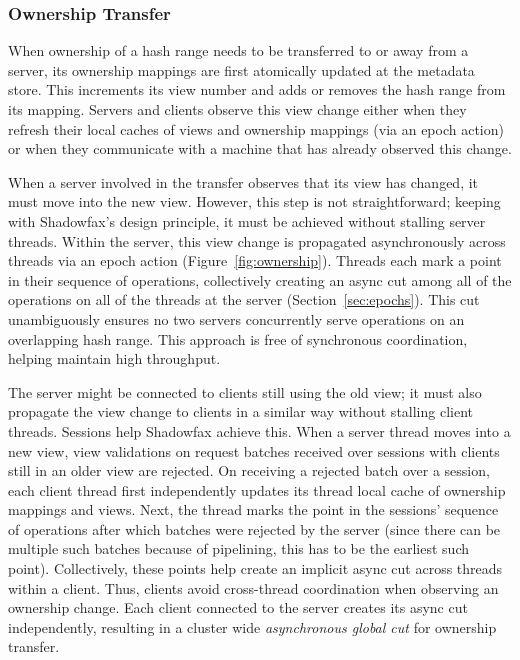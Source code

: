\subsubsection{Ownership Transfer}
\label{design:ownership-tx}

When ownership of a hash range needs to be transferred to or away from a
server, its ownership mappings are first atomically updated at the
metadata store.
%
This increments its view number and adds or removes the hash range from
its mapping.
%
Servers and clients observe this view change either when they refresh
their local caches of views and ownership mappings (via an epoch action) or
when they communicate with a machine that has already observed this change.

When a server involved in the transfer observes that its view has
changed, it must move into the new view.
%
However, this step is not straightforward; keeping with
Shadowfax's design principle, it must be achieved without stalling
server threads.
%
%
%
Within the server, this view change is propagated asynchronously across
threads via an epoch action (Figure~\ref{fig:ownership}).
%
Threads each mark a point in their sequence of operations, collectively creating
an async cut among all of the operations on all of the threads at the server
(Section~\ref{sec:epochs}).
%
This cut unambiguously ensures no two servers concurrently
serve operations on an overlapping hash range.
%
This approach is free of synchronous coordination, helping maintain high
throughput.

The server might be connected to clients still using the old view; it must also
propagate the view change to clients in a similar way without stalling client
threads.
%
Sessions help Shadowfax achieve this.
%
%
When a server thread moves into a new view, view validations on request
batches received over sessions with clients still in an older view
are rejected.
%
%
%
On receiving a rejected batch over a session, each client thread first
independently updates its thread local cache of ownership mappings and
views.
%
Next, the thread marks the point in the sessions' sequence of
operations after which batches were rejected by the server (since there
can be multiple such batches because of pipelining, this has to be
the earliest such point).
%
Collectively, these points help create an implicit async cut across
threads within a
client.
%
Thus, clients avoid cross-thread
coordination when observing an ownership change.
%
Each client connected to the server creates its async cut independently,
resulting in a cluster wide \emph{asynchronous global cut} for ownership
transfer.

